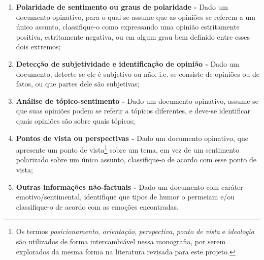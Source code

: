 



\begin{enumerate}
    \item \textbf{Polaridade de sentimento ou graus de polaridade -} Dado um documento opinativo, para o qual se assume que as opiniões se referem a um único assunto, classifique-o como expressando uma opinião estritamente positiva, estritamente negativa, ou em algum grau bem definido entre esses dois extremos;
    \item \textbf{Detecção de subjetividade e identificação de opinião -} Dado um documento, detecte se ele é subjetivo ou não, i.e. se consiste de opiniões ou de fatos, ou que partes dele são subjetivas;
    \item \textbf{Análise de tópico-sentimento -} Dado um documento opinativo, assume-se que suas opiniões podem se referir a tópicos diferentes, e deve-se identificar quais opiniões são sobre quais tópicos;
   \item \textbf{Pontos de vista ou perspectivas -} Dado um documento opinativo, que apresente um ponto de vista\footnote{Os termos \emph{posicionamento}, \emph{orientação}, \emph{perspectiva}, \emph{ponto de vista} e \emph{ideologia} são utilizados de forma intercambiável nessa monografia, por serem explorados da mesma forma na literatura revisada para este projeto.} sobre um tema, em vez de um sentimento polarizado sobre um único assunto, classifique-o de acordo com esse ponto de vista;
   \item \textbf{Outras informações não-factuais -} Dado um documento com caráter emotivo/sentimental, identifique que tipos de humor o permeiam e/ou classifique-o de acordo com as emoções encontradas.

\end{enumerate}


